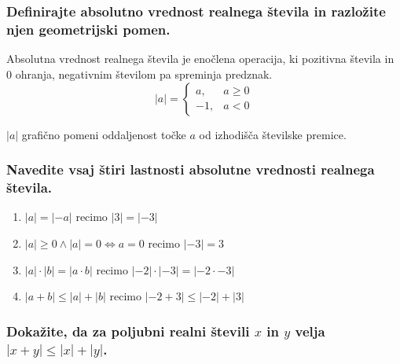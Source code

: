 \documentclass{article}
\begin{document}
\section{\texorpdfstring{}{Absolutna vrednost}}
\subsubsection*{Definirajte absolutno vrednost realnega števila in razložite njen geometrijski pomen.}

Absolutna vrednost realnega števila je enočlena operacija, ki pozitivna števila in 0 ohranja, negativnim številom pa spreminja predznak.
$$
|a| =     \begin{cases}
      a, & a \geq 0 \\
      -1, & a < 0
    \end{cases}
$$

$|a|$ grafično pomeni oddaljenost točke $a$ od izhodišča številske premice.

\subsubsection*{Navedite vsaj štiri lastnosti absolutne vrednosti realnega števila.}

\begin{enumerate}
    \item $|a| = |-a|$ recimo $|3| = |-3|$
    \item $|a| \geq 0 \land |a| = 0 \Leftrightarrow a = 0$ recimo $|-3| = 3$
    \item $|a| \cdot |b| = |a \cdot b|$ recimo $|-2| \cdot |-3| = |-2 \cdot -3|$
    \item $|a + b| \leq |a| + |b|$ recimo $|-2 + 3| \leq |-2| + |3|$
\end{enumerate}

\subsubsection*{Dokažite, da za poljubni realni števili $x$ in $y$ velja $|x+y| \leq|x|+|y|$.}
\end{document}
